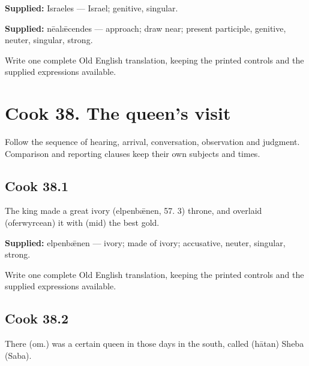 \textbf{Supplied:} Israeles — Israel; genitive, singular.

\textbf{Supplied:} nēalǣcendes — approach; draw near; present participle, genitive, neuter, singular, strong.

Write one complete Old English translation, keeping the printed controls and the supplied expressions available.

\section*{Cook 38. The queen’s visit}

Follow the sequence of hearing, arrival, conversation, observation and judgment. Comparison and reporting clauses keep their own subjects and times.

\par\begin{minipage}{\linewidth}\raggedright
\subsection*{Cook 38.1}

The king made a great ivory (elpenbǣnen, 57. 3) throne, and overlaid (oferwyrcean) it with (mid) the best gold.

\end{minipage}\par\addvspace{4pt}

\textbf{Supplied:} elpenbǣnen — ivory; made of ivory; accusative, neuter, singular, strong.

Write one complete Old English translation, keeping the printed controls and the supplied expressions available.

\par\begin{minipage}{\linewidth}\raggedright
\subsection*{Cook 38.2}

There (om.) was a certain queen in those days in the south, called (hātan) Sheba (Saba).

\end{minipage}\par\addvspace{4pt}

